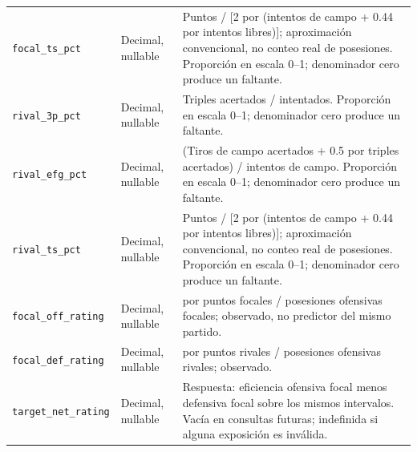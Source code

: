 \begin{longtable}{@{}>{\raggedright\arraybackslash}p{5.0cm}>{\raggedright\arraybackslash}p{1.9cm}>{\raggedright\arraybackslash}p{7.7cm}@{}}
\texttt{focal\_\allowbreak ts\_\allowbreak pct} & Decimal, nullable & Puntos / [2 por (intentos de campo + 0.44 por intentos libres)]; aproximación convencional, no conteo real de posesiones. Proporción en escala 0--1; denominador cero produce un faltante.\\
\texttt{rival\_\allowbreak 3p\_\allowbreak pct} & Decimal, nullable & Triples acertados / intentados. Proporción en escala 0--1; denominador cero produce un faltante.\\
\texttt{rival\_\allowbreak efg\_\allowbreak pct} & Decimal, nullable & (Tiros de campo acertados + 0.5 por triples acertados) / intentos de campo. Proporción en escala 0--1; denominador cero produce un faltante.\\
\texttt{rival\_\allowbreak ts\_\allowbreak pct} & Decimal, nullable & Puntos / [2 por (intentos de campo + 0.44 por intentos libres)]; aproximación convencional, no conteo real de posesiones. Proporción en escala 0--1; denominador cero produce un faltante.\\
\texttt{focal\_\allowbreak off\_\allowbreak rating} & Decimal, nullable & 100 por puntos focales / posesiones ofensivas focales; observado, no predictor del mismo partido.\\
\texttt{focal\_\allowbreak def\_\allowbreak rating} & Decimal, nullable & 100 por puntos rivales / posesiones ofensivas rivales; observado.\\
\texttt{target\_\allowbreak net\_\allowbreak rating} & Decimal, nullable & Respuesta: eficiencia ofensiva focal menos defensiva focal sobre los mismos intervalos. Vacía en consultas futuras; indefinida si alguna exposición es inválida.\\
\end{longtable}
\endgroup
\begingroup
\small
{}
\setlength{\tabcolsep}{4pt}
\renewcommand{\arraystretch}{1.15}
